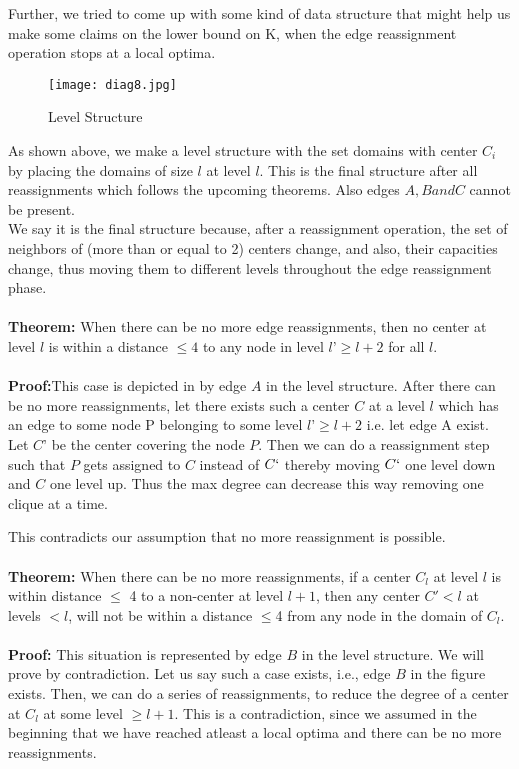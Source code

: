 \documentclass[12pt,a4paper,onecolumn]{article}
\begin{document}
\begin{itemize}
Further, we tried to come up with some kind of data structure that might help us make some claims on the lower bound on K, when the edge reassignment operation stops at a local optima. \begin{figure}[H]
\texttt{[image: diag8.jpg]}
\caption{Level Structure}
\end{figure}
As shown above, we make a level structure with the set domains with center $C_i$ by placing the domains of size $l$ at level $l$. This is the final structure after all reassignments which follows the upcoming theorems. Also edges $A, B and C$ cannot be present.\\ We say it is the final structure because, after a reassignment operation, the set of neighbors of (more than or equal to 2) centers change, and also, their capacities change, thus moving them to different levels throughout the edge reassignment phase. \\\\\textbf{Theorem:}
When there can be no more edge reassignments, then no center at level $l$ is within a distance $\leq 4$ to any node in level $l’ \geq l+2$ for all $l$. 
\\\\
\textbf{Proof:}This case is depicted in by edge $A$ in the level structure. After there can be no more reassignments, let there exists such a center $C$ at a level $l$ which has an edge to some node P belonging to some level $l’ \geq l + 2$ i.e. let edge A exist. Let $C’$ be the center covering the node $P$. Then we can do a reassignment step such that $P$ gets assigned to $C$ instead of $C`$ thereby moving $C`$ one level down and $C$ one level up. Thus the max degree can decrease this way removing one clique at a time. 

This contradicts our assumption that no more reassignment is possible.\\\\
\textbf{Theorem:} When there can be no more reassignments, if a center $C_l$ at level $l$ is within distance $\leq$ 4 to a non-center at level $l+1$, then any center $C'< l$ at levels $< l$, will not be within a distance $\leq$4 from any node in the domain of $C_l$.\\\\
\textbf{Proof:}
This situation is represented by edge $B$ in the level structure. We will prove by contradiction. Let us say such a case exists, i.e., edge $B$ in the figure exists. Then, we can do a series of reassignments, to reduce the degree of a center at $C_l$ at some level $\geq l + 1$. This is a contradiction, since we assumed in the beginning that we have reached atleast a local optima and there can be no more reassignments.


\end{itemize}
\end{document}
